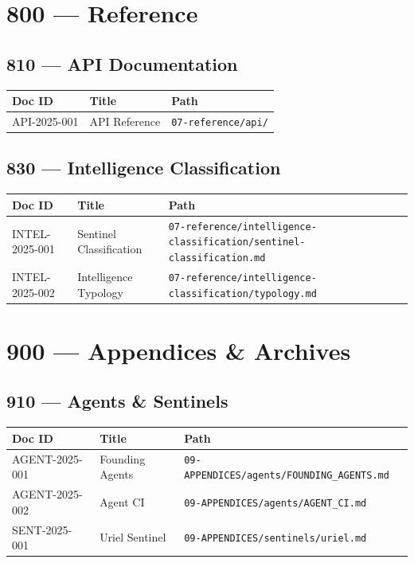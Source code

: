 \documentclass[11pt,a4paper]{article}
\begin{document}
\section{800 — Reference}

\subsection{810 — API Documentation}

\begin{longtable}{p{2cm}p{8cm}p{3cm}}
\toprule
\textbf{Doc ID} & \textbf{Title} & \textbf{Path} \\
\midrule
API-2025-001 & API Reference & \texttt{07-reference/api/} \\
\bottomrule
\end{longtable}

\subsection{830 — Intelligence Classification}

\begin{longtable}{p{2cm}p{8cm}p{3cm}}
\toprule
\textbf{Doc ID} & \textbf{Title} & \textbf{Path} \\
\midrule
INTEL-2025-001 & Sentinel Classification & \texttt{07-reference/intelligence-classification/sentinel-classification.md} \\
INTEL-2025-002 & Intelligence Typology & \texttt{07-reference/intelligence-classification/typology.md} \\
\bottomrule
\end{longtable}

\section{900 — Appendices \& Archives}

\subsection{910 — Agents \& Sentinels}

\begin{longtable}{p{2cm}p{8cm}p{3cm}}
\toprule
\textbf{Doc ID} & \textbf{Title} & \textbf{Path} \\
\midrule
AGENT-2025-001 & Founding Agents & \texttt{09-APPENDICES/agents/FOUNDING\_AGENTS.md} \\
AGENT-2025-002 & Agent CI & \texttt{09-APPENDICES/agents/AGENT\_CI.md} \\
SENT-2025-001 & Uriel Sentinel & \texttt{09-APPENDICES/sentinels/uriel.md} \\
\bottomrule
\end{longtable}
\end{document}
